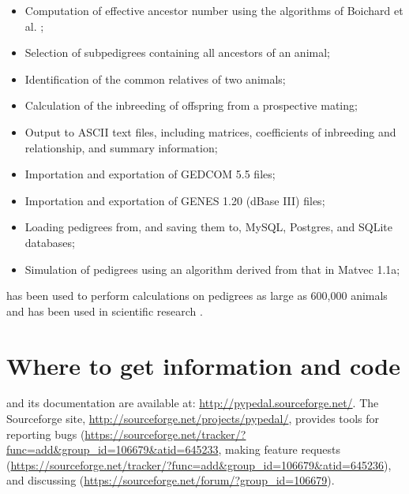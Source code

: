 \begin{itemize}
\item Computation of effective ancestor number using the algorithms of Boichard et al. \citeyear{ref352};
\item Selection of subpedigrees containing all ancestors of an animal;
\item Identification of the common relatives of two animals;
\item Calculation of the inbreeding of offspring from a prospective mating;
\item Output to ASCII text files, including matrices, coefficients of inbreeding and relationship, and summary information;
\item Importation and exportation of GEDCOM 5.5 files;
\item Importation and exportation of GENES 1.20 (dBase III) files;
\item Loading pedigrees from, and saving them to, MySQL, Postgres, and SQLite databases;
\item Simulation of pedigrees using an algorithm derived from that in Matvec 1.1a;
\end{itemize}
\PyPedal{} has been used to perform calculations on pedigrees as large as 600,000 animals and has been used in scientific research \cite{Cole2004a,Cole2007a}.

\section{Where to get information and code}
\PyPedal{} and its documentation are available at: \url{http://pypedal.sourceforge.net/}.  The Sourceforge site, \url{http://sourceforge.net/projects/pypedal/}, provides tools for reporting bugs (\url{https://sourceforge.net/tracker/?func=add&group_id=106679&atid=645233}, making feature requests (\url{https://sourceforge.net/tracker/?func=add&group_id=106679&atid=645236}), and discussing \PyPedal{} (\url{https://sourceforge.net/forum/?group_id=106679}).


